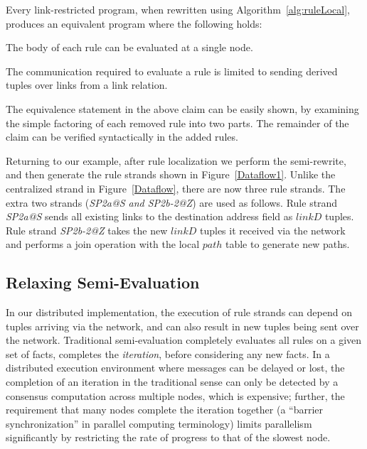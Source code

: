 \begin{Claim}\label{claim:ruleLocal} Every link-restricted \Dlog program, when rewritten using
  Algorithm~\ref{alg:ruleLocal}, produces an equivalent program where
  the following holds:
\begin{CompactEnumerate}
\item The body of each rule can be evaluated at a single node.
\item The communication required to evaluate a rule is limited to
	sending derived tuples over links from a link relation.
\end{CompactEnumerate}
\end{Claim}

The equivalence statement in the above claim can be easily shown,
by examining the simple factoring of each removed rule into two parts. The
remainder of the claim can be verified syntactically in the added rules.
% 


Returning to our example, after rule localization we perform the %
semi-\naive rewrite, and then generate the rule strands shown in
Figure~\ref{Dataflow1}.  Unlike the centralized strand in
Figure~\ref{Dataflow}, there are now three rule strands. The extra two
strands ({\em SP2a@S and SP2b-2@Z}) are used as follows. Rule strand
{\em SP2a@S} sends all existing links to the destination address field
as $linkD$ tuples.  Rule strand {\em SP2b-2@Z} takes the new $linkD$
tuples it received via the network and performs a join operation with
the local $path$ table to generate new paths.


\subsection{Relaxing Semi-\naive Evaluation}
In our distributed implementation, the execution of rule strands can
depend on tuples arriving via the network, and can also result in new
tuples being sent over the network. Traditional
semi-\naive evaluation completely evaluates all rules on a given set of
facts, \ie completes the {\em iteration}, before considering any new
facts.  In a distributed execution environment where
messages can be delayed or lost, the completion of an iteration in the
traditional sense can
only be detected by a consensus computation across multiple nodes,
which is expensive; further,
the requirement that many nodes complete the iteration
together (a ``barrier synchronization'' in parallel computing
terminology) limits parallelism significantly by restricting the rate
of progress to that of the slowest node.

